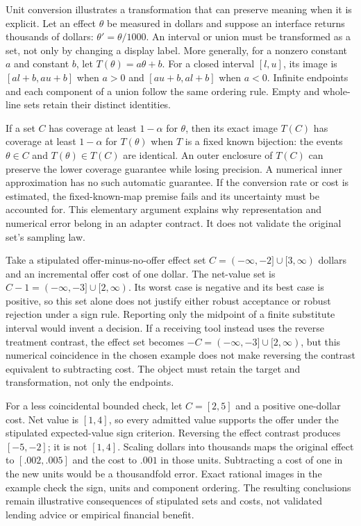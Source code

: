 Unit conversion illustrates a transformation that can preserve meaning
when it is explicit. Let an effect $\theta$ be measured in dollars and
suppose an interface returns thousands of dollars: $\theta'=\theta/1000$.
An interval or union must be transformed as a set, not only by changing
a display label. More generally, for a nonzero constant $a$ and constant
$b$, let $T(\theta)=a\theta+b$. For a closed interval $[l,u]$, its image
is $[al+b,au+b]$ when $a>0$ and $[au+b,al+b]$ when $a<0$. Infinite
endpoints and each component of a union follow the same ordering rule.
Empty and whole-line sets retain their distinct identities.
\citep{exec14_l6_adapter_exact}

If a set $C$ has coverage at least $1-\alpha$ for $\theta$, then its exact
image $T(C)$ has coverage at least $1-\alpha$ for $T(\theta)$ when $T$ is
a fixed known bijection: the events $\theta\in C$ and
$T(\theta)\in T(C)$ are identical. An outer enclosure of $T(C)$ can
preserve the lower coverage guarantee while losing precision. A numerical
inner approximation has no such automatic guarantee. If the conversion
rate or cost is estimated, the fixed-known-map premise fails and its
uncertainty must be accounted for. This elementary argument explains why
representation and numerical error belong in an adapter contract. It
does not validate the original set's sampling law.

Take a stipulated offer-minus-no-offer effect set
$C=(-\infty,-2]\cup[3,\infty)$ dollars and an incremental offer cost
of one dollar. The net-value set is
$C-1=(-\infty,-3]\cup[2,\infty)$. Its worst case is negative and its
best case is positive, so this set alone does not justify either robust
acceptance or robust rejection under a sign rule. Reporting only the
midpoint of a finite substitute interval would invent a decision. If a
receiving tool instead uses the reverse treatment contrast, the effect
set becomes $-C=(-\infty,-3]\cup[2,\infty)$, but this numerical
coincidence in the chosen example does not make reversing the contrast
equivalent to subtracting cost. The object must retain the target and
transformation, not only the endpoints.

For a less coincidental bounded check, let $C=[2,5]$ and a positive
one-dollar cost. Net value is $[1,4]$, so every admitted value supports
the offer under the stipulated expected-value sign criterion. Reversing
the effect contrast produces $[-5,-2]$; it is not $[1,4]$. Scaling
dollars into thousands maps the original effect to $[.002,.005]$ and
the cost to $.001$ in those units. Subtracting a cost of one in the new
units would be a thousandfold error. Exact rational images in the example
check the sign, units and component ordering. The resulting conclusions
remain illustrative consequences of stipulated sets and costs, not
validated lending advice or empirical financial benefit.
\citep{exec14_l6_adapter_exact}

